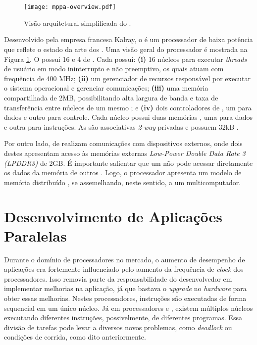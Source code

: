 \section{\mppa}
\label{sec:mppa256}

\begin{figure}[tb]
  \centering
  \caption{Visão arquitetural simplificada do \mppa.}
  \label{fig:mppa256overview}
  \texttt{[image: mppa-overview.pdf]}
\end{figure}

Desenvolvido pela empresa francesa Kalray, o \mppa é um processador de baixa potência que reflete o estado da arte dos \manycores. Uma visão geral do processador é mostrada na Figura \ref{fig:mppa256overview}. O \mppa possui 16 \CCs e 4 \clusters de \IO. Cada \CC possui: \textbf{(i)} 16 núcleos para executar \textit{threads} de usuário em modo ininterrupto e não preemptivo, os quais atuam com frequência de 400 MHz; \textbf{(ii)} um gerenciador de recursos responsável por executar
o sistema operacional e gerenciar comunicações; \textbf{(iii)} uma memória compartilhada de 2MB, possibilitando alta largura de banda e taxa de transferência entre núcleos de um mesmo \cluster; e \textbf{(iv)} dois controladores de \textit{\NoC}, um para dados e outro para controle. Cada núcleo possui duas memórias \cache, uma para dados e outra para instruções. As \caches são associativas \textit{2-way} privadas e possuem 32kB \cite{Podesta2018Stencil}.

Por outro lado, \clusters de \IO realizam comunicações com dispositivos externos, onde dois destes apresentam acesso às memórias externas \textit{Low-Power Double Data Rate 3 (LPDDR3)} de 2GB. É importante salientar que um \CC não pode acessar diretamente os dados da memória de outros \clusters. Logo, o processador apresenta um modelo de memória distribuído \cite{Castro-Souza-CCPE:2016, Podesta2018Stencil}, se assemelhando, neste sentido, a um multicomputador.

\section{Desenvolvimento de Aplicações Paralelas}
\label{sec:bibliotecasdevparalelo}

Durante o domínio de processadores \singlecore no mercado, o aumento de desempenho de aplicações era fortemente influenciado pelo aumento da frequência de \textit{clock} dos processadores. Isso removia parte da responsabilidade do desenvolvedor em implementar melhorias na aplicação, já que bastava o \textit{upgrade} no \textit{hardware} para obter essas melhorias. Nestes processadores, instruções são executadas de forma sequencial em um único núcleo. Já em processadores \multicore e \manycore, existem múltiplos núcleos executando diferentes instruções, possivelmente, de diferentes programas. Essa divisão de tarefas pode levar a diversos novos problemas, como \textit{deadlock} ou condições de corrida, como dito anteriormente.

